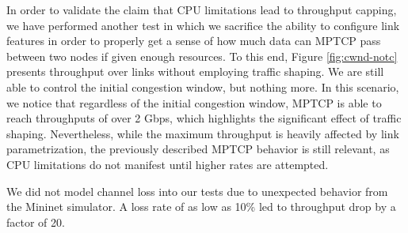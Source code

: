 In order to validate the claim that CPU limitations lead to throughput
capping, we have performed another test in which we sacrifice the ability
to configure link features in order to properly get a sense of how much
data can MPTCP pass between two nodes if given enough resources. To this end,
Figure \ref{fig:cwnd-notc} presents throughput over links without employing
traffic shaping. We are still able to control the initial congestion window,
but nothing more. In this scenario, we notice that regardless of the initial
congestion window, MPTCP is able to reach throughputs of over 2 Gbps, which
highlights the significant effect of traffic shaping. Nevertheless, while the
maximum throughput is heavily affected by link parametrization, the previously
described MPTCP behavior is still relevant, as CPU limitations do not manifest
until higher rates are attempted.

We did not model channel loss into our tests due to  unexpected behavior from the Mininet simulator. A loss rate of as low as 10\% led to throughput drop by a factor of 20.

